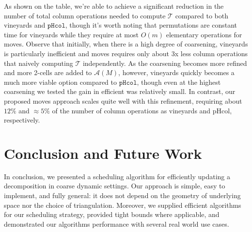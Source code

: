 \documentclass{siamart190516}
\begin{document}
\noindent
As shown on the table, we're able to achieve a significant reduction in the number of total column operations needed to compute $\mathcal{T}$ compared to both vineyards and $\mathtt{pHcol}$, though it's worth noting that permutations are constant time for vineyards while they require at most $O(m)$ elementary operations for moves. Observe that initially, when there is a high degree of coarsening, vineyards is particularly inefficient and moves requires only about 3x less column operations that naively computing $\mathcal{T}$ independently. As the coarsening becomes more refined and more 2-cells are added to $\mathcal{A}(M)$, however, vineyards quickly becomes a much more viable option compared to $\mathtt{pHcol}$, though even at the highest coarsening we tested the gain in efficient was relatively small. In contrast, our proposed moves approach scales quite well with this refinement, requiring about $12\%$  and $\approx 5\%$ of the number of column operations as vineyards and $\mathrm{pHcol}$, respectively. 






\section{Conclusion and Future Work}\label{sec:conclusion}
In conclusion, we presented a scheduling algorithm for efficiently updating a decomposition in coarse dynamic settings. Our approach is simple, easy to implement, and fully general: it does not depend on the geometry of underlying space nor the choice of triangulation. Moreover, we supplied efficient algorithms for our scheduling strategy, provided tight bounds where applicable, and demonstrated our algorithms performance with several real world use cases.
\end{document}
